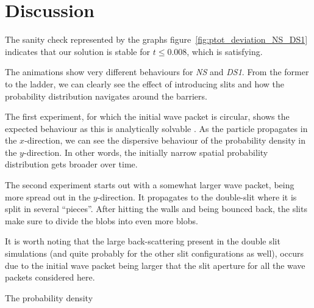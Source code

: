\section{Discussion}\label{sec:discussion}



The sanity check represented by the graphs figure~\ref{fig:ptot_deviation_NS_DS1} indicates that our solution is stable for $t\leq 0.008$, which is satisfying. 


The animations show very different behaviours for \textit{NS} and \textit{DS1}. From the former to the ladder, we can clearly see the effect of introducing slits and how the probability distribution navigates around the barriers. 

The first experiment, for which the initial wave packet is circular, shows the expected behaviour as this is analytically solvable . As the particle propagates in the $x$-direction, we can see the dispersive behaviour of the probability density in the $y$-direction. In other words, the initially narrow spatial probability distribution gets broader over time.


The second experiment starts out with a somewhat larger wave packet, being more spread out in the $y$-direction. It propagates to the double-slit where it is split in several ``pieces''. After hitting the walls and being bounced back, the slits make sure to divide the blobs into even more blobs. 



It is worth noting that the large back-scattering present in the double slit simulations (and quite probably for the other slit configurations as well), occurs due to the initial wave packet being larger that the slit aperture for all the wave packets considered here. 



The probability density 









